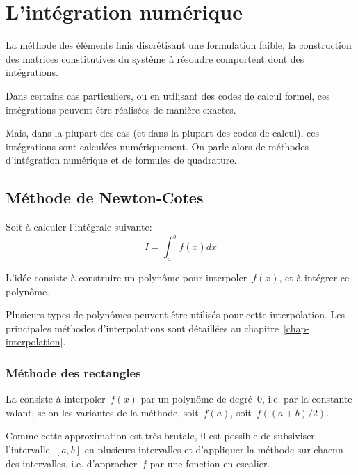 \chapter{L'intégration numérique}\label{chap-quadrature}

La méthode des éléments finis discrétisant une formulation faible, la construction des matrices 
constitutives du système à résoudre comportent dont des intégrations.

Dans certains cas particuliers, ou en utilisant des codes de calcul formel, ces intégrations
peuvent être réalisées de manière exactes.

Mais, dans la plupart des cas (et dans la plupart des codes de calcul), ces
intégrations sont calculées numériquement. On parle alors de méthodes
d'intégration numérique et de formules de quadrature.






\medskip
\section{Méthode de Newton-Cotes}

Soit à calculer l'intégrale suivante:
\begin{equation}I=\int_a^b f(x)dx\end{equation}

\medskip
L'idée consiste à construire un polynôme pour interpoler~$f(x)$, et
à intégrer ce polynôme.

\medskip
Plusieurs types de polynômes peuvent être utilisés pour cette interpolation.
Les principales méthodes d'interpolations sont détaillées au chapitre~\ref{chap-interpolation}.



\medskip
\subsection*{Méthode des rectangles}

La  consiste à interpoler~$f(x)$ par un
polynôme de degré~$0$, i.e. par la constante valant, selon les variantes de la
méthode, soit~$f(a)$, soit~$f((a+b)/2)$.

\medskip
Comme cette approximation est très brutale, il est possible de subsiviser
l'intervalle~$[a,b]$ en plusieurs intervalles et d'appliquer la méthode sur chacun
des intervalles, i.e. d'approcher~$f$ par une fonction en escalier.

